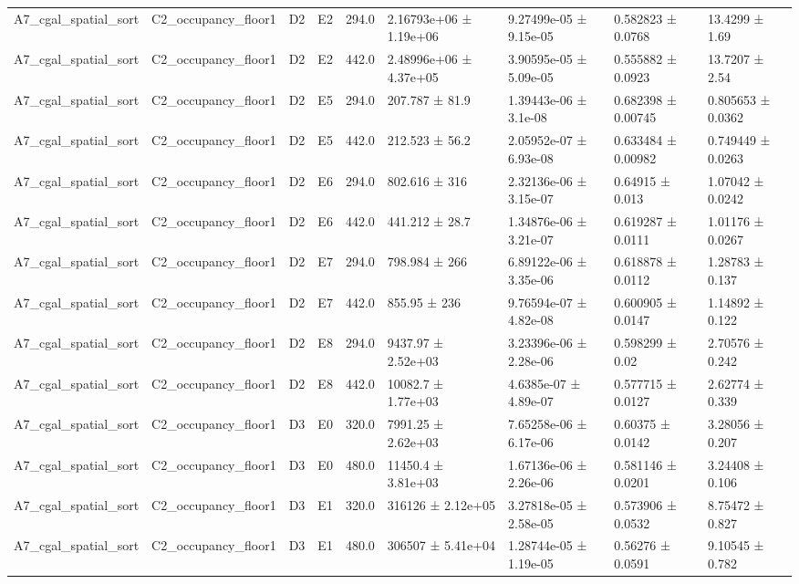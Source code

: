 \begin{table}
\begin{tabular}{lllllllll}
A7\_cgal\_spatial\_sort & C2\_occupancy\_floor1 & D2 & E2 & 294.0 & 2.16793e+06 ± 1.19e+06 & 9.27499e-05 ± 9.15e-05 & 0.582823 ± 0.0768 & 13.4299 ± 1.69 \\
A7\_cgal\_spatial\_sort & C2\_occupancy\_floor1 & D2 & E2 & 442.0 & 2.48996e+06 ± 4.37e+05 & 3.90595e-05 ± 5.09e-05 & 0.555882 ± 0.0923 & 13.7207 ± 2.54 \\
A7\_cgal\_spatial\_sort & C2\_occupancy\_floor1 & D2 & E5 & 294.0 & 207.787 ± 81.9 & 1.39443e-06 ± 3.1e-08 & 0.682398 ± 0.00745 & 0.805653 ± 0.0362 \\
A7\_cgal\_spatial\_sort & C2\_occupancy\_floor1 & D2 & E5 & 442.0 & 212.523 ± 56.2 & 2.05952e-07 ± 6.93e-08 & 0.633484 ± 0.00982 & 0.749449 ± 0.0263 \\
A7\_cgal\_spatial\_sort & C2\_occupancy\_floor1 & D2 & E6 & 294.0 & 802.616 ± 316 & 2.32136e-06 ± 3.15e-07 & 0.64915 ± 0.013 & 1.07042 ± 0.0242 \\
A7\_cgal\_spatial\_sort & C2\_occupancy\_floor1 & D2 & E6 & 442.0 & 441.212 ± 28.7 & 1.34876e-06 ± 3.21e-07 & 0.619287 ± 0.0111 & 1.01176 ± 0.0267 \\
A7\_cgal\_spatial\_sort & C2\_occupancy\_floor1 & D2 & E7 & 294.0 & 798.984 ± 266 & 6.89122e-06 ± 3.35e-06 & 0.618878 ± 0.0112 & 1.28783 ± 0.137 \\
A7\_cgal\_spatial\_sort & C2\_occupancy\_floor1 & D2 & E7 & 442.0 & 855.95 ± 236 & 9.76594e-07 ± 4.82e-08 & 0.600905 ± 0.0147 & 1.14892 ± 0.122 \\
A7\_cgal\_spatial\_sort & C2\_occupancy\_floor1 & D2 & E8 & 294.0 & 9437.97 ± 2.52e+03 & 3.23396e-06 ± 2.28e-06 & 0.598299 ± 0.02 & 2.70576 ± 0.242 \\
A7\_cgal\_spatial\_sort & C2\_occupancy\_floor1 & D2 & E8 & 442.0 & 10082.7 ± 1.77e+03 & 4.6385e-07 ± 4.89e-07 & 0.577715 ± 0.0127 & 2.62774 ± 0.339 \\
A7\_cgal\_spatial\_sort & C2\_occupancy\_floor1 & D3 & E0 & 320.0 & 7991.25 ± 2.62e+03 & 7.65258e-06 ± 6.17e-06 & 0.60375 ± 0.0142 & 3.28056 ± 0.207 \\
A7\_cgal\_spatial\_sort & C2\_occupancy\_floor1 & D3 & E0 & 480.0 & 11450.4 ± 3.81e+03 & 1.67136e-06 ± 2.26e-06 & 0.581146 ± 0.0201 & 3.24408 ± 0.106 \\
A7\_cgal\_spatial\_sort & C2\_occupancy\_floor1 & D3 & E1 & 320.0 & 316126 ± 2.12e+05 & 3.27818e-05 ± 2.58e-05 & 0.573906 ± 0.0532 & 8.75472 ± 0.827 \\
A7\_cgal\_spatial\_sort & C2\_occupancy\_floor1 & D3 & E1 & 480.0 & 306507 ± 5.41e+04 & 1.28744e-05 ± 1.19e-05 & 0.56276 ± 0.0591 & 9.10545 ± 0.782 \\

\end{tabular}
\end{table}
